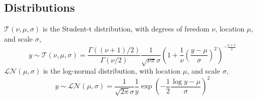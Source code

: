 \documentclass[11pt, oneside, article]{memoir}
\newcommand{\dist}[1]{\mathcal{#1}}
\newcommand{\paren}[1]{\mathopen{}\left(#1\right)\mathclose{}}
\newcommand{\disti}[2]{\ensuremath{\dist{#1}\paren{#2}}}
\newcommand{\dlnorm}[1]{\disti{LN}{#1}}
\newcommand{\dt}[1]{\disti{T}{#1}}
\begin{document}
\subsection{Distributions}

$\dt{\nu, \mu, \sigma}$ is the Student-t distribution, with degrees of freedom $\nu$, location $\mu$, and scale $\sigma$,
\begin{equation}
  \label{eq:8}
  y \sim \dt{\nu, \mu, \sigma} = \frac{\Gamma((\nu + 1) / 2)}{\Gamma(\nu / 2)} \frac{1}{\sqrt{\nu \pi} \sigma} 
  \left(
    1 + \frac{1}{\nu}
    \left(
      \frac{y - \mu}{\sigma}
    \right)^{2}
  \right)^{-\frac{\nu + 1}{2}}
\end{equation}
$\dlnorm{\mu, \sigma}$ is the log-normal distribution, with location $\mu$, and scale $\sigma$,
\begin{equation}
  \label{eq:7}
  y \sim \dlnorm{\mu, \sigma} = \frac{1}{\sqrt{2 \pi} \sigma} \frac{1}{y} \exp
  \left(
    - \frac{1}{2} \frac{\log y - \mu}{\sigma}
  \right)^{2}
\end{equation}

\printbibliography{}
\end{document}

